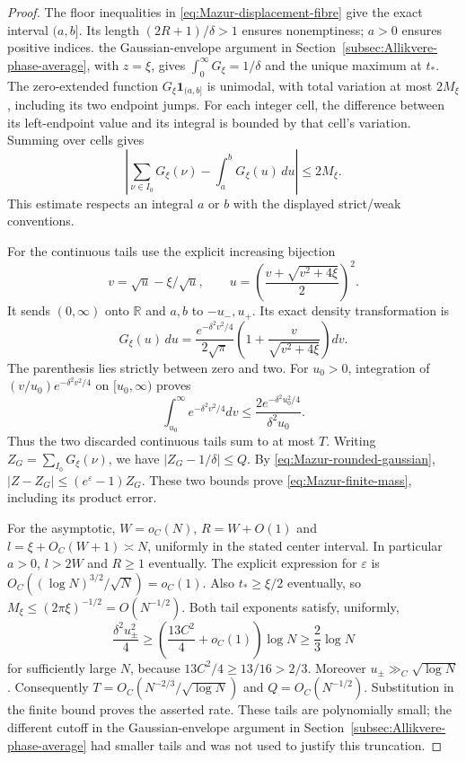 \begin{proof}
The floor inequalities in
\eqref{eq:Mazur-displacement-fibre} give the exact interval $(a,b]$.
Its length $(2R+1)/\delta>1$ ensures nonemptiness; $a>0$ ensures
positive indices. the Gaussian-envelope argument in Section~\ref{subsec:Allikvere-phase-average}, with $z=\xi$,
gives $\int_0^\infty G_\xi=1/\delta$ and the unique maximum at
$t_*$. The zero-extended function $G_\xi\mathbf1_{(a,b]}$ is
unimodal, with total variation at most $2M_\xi$, including its two
endpoint jumps. For each integer cell, the difference between its
left-endpoint value and its integral is bounded by that cell's
variation. Summing over cells gives
\[
 \left|\sum_{\nu\in I_0}G_\xi(\nu)-\int_a^bG_\xi(u)\,du\right|
 \le 2M_\xi.
\]
This estimate respects an integral $a$ or $b$ with the displayed
strict/weak conventions.

For the continuous tails use the explicit increasing bijection
\[
 v=\sqrt u-\xi/\sqrt u,\qquad
 u=\left(\frac{v+\sqrt{v^2+4\xi}}2\right)^2.
\]
It sends $(0,\infty)$ onto $\mathbb R$ and $a,b$ to $-u_-,u_+$.
Its exact density transformation is
\[
 G_\xi(u)\,du=\frac{e^{-\delta^2v^2/4}}{2\sqrt\pi}
       \left(1+\frac v{\sqrt{v^2+4\xi}}\right)dv.
\]
The parenthesis lies strictly between zero and two.
For $u_0>0$, integration of
$(v/u_0)e^{-\delta^2v^2/4}$ on $[u_0,\infty)$ proves
\[
 \int_{u_0}^\infty e^{-\delta^2v^2/4}dv
 \le\frac{2e^{-\delta^2u_0^2/4}}{\delta^2u_0}.
\]
Thus the two discarded continuous tails sum to at most $T$.
Writing $Z_G=\sum_{I_0}G_\xi(\nu)$, we have
$|Z_G-1/\delta|\le Q$. By
\eqref{eq:Mazur-rounded-gaussian},
$|Z-Z_G|\le(e^\varepsilon-1)Z_G$.
These two bounds prove \eqref{eq:Mazur-finite-mass}, including
its product error.

For the asymptotic, $W=o_C(N)$, $R=W+O(1)$ and
$l=\xi+O_C(W+1)\asymp N$, uniformly in the stated center interval.
In particular $a>0$, $l>2W$ and $R\ge1$ eventually.
The explicit expression for $\varepsilon$ is
$O_C((\log N)^{3/2}/\sqrt N)=o_C(1)$.
Also $t_*\ge\xi/2$ eventually, so
$M_\xi\le(2\pi\xi)^{-1/2}=O(N^{-1/2})$.
Both tail exponents satisfy, uniformly,
\[
 \frac{\delta^2u_\pm^2}{4}
 \ge\left(\frac{13C^2}{4}+o_C(1)\right)\log N
 \ge\frac23\log N
\]
for sufficiently large $N$, because $13C^2/4\ge13/16>2/3$.
Moreover $u_\pm\gg_C\sqrt{\log N}$. Consequently
$T=O_C(N^{-2/3}/\sqrt{\log N})$ and $Q=O_C(N^{-1/2})$.
Substitution in the finite bound proves the asserted rate.
These tails are polynomially small; the different cutoff in
the Gaussian-envelope argument in Section~\ref{subsec:Allikvere-phase-average} had smaller tails and was not used
to justify this truncation.
\end{proof}

